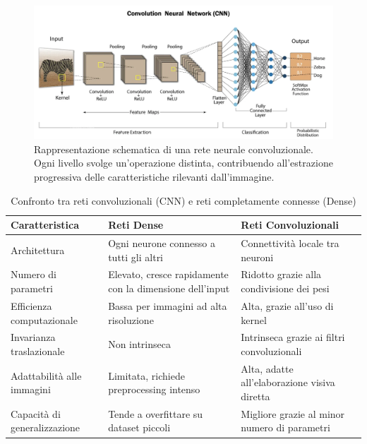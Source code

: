 \begin{figure}[ht]
    \centering
    \includegraphics[width=\textwidth]{figure/ConvNN.png}
    \caption{Rappresentazione schematica di una rete neurale convoluzionale. Ogni livello svolge un’operazione distinta, contribuendo all’estrazione progressiva delle caratteristiche rilevanti dall’immagine.}
    \label{fig:ConvNN}
\end{figure}


\begin{table}[ht]
    \centering
    \caption{Confronto tra reti convoluzionali (CNN) e reti completamente connesse (Dense)}
    \label{tab:cnn_vs_dense}
    \begin{adjustbox}{width=\textwidth}
    \begin{tabular}{p{4.5cm}|p{4.5cm}|p{4.5cm}}
        \hline
        \textbf{Caratteristica} & \textbf{Reti Dense} & \textbf{Reti Convoluzionali} \\
        \hline
        Architettura & Ogni neurone connesso a tutti gli altri & Connettività locale tra neuroni \\
        \hline
        Numero di parametri & Elevato, cresce rapidamente con la dimensione dell’input & Ridotto grazie alla condivisione dei pesi \\
        \hline
        Efficienza computazionale & Bassa per immagini ad alta risoluzione & Alta, grazie all’uso di kernel \\
        \hline
        Invarianza traslazionale & Non intrinseca & Intrinseca grazie ai filtri convoluzionali \\
        \hline
        Adattabilità alle immagini & Limitata, richiede preprocessing intenso & Alta, adatte all’elaborazione visiva diretta \\
        \hline
        Capacità di generalizzazione & Tende a overfittare su dataset piccoli & Migliore grazie al minor numero di parametri \\
        \hline
    \end{tabular}
    \end{adjustbox}
\end{table}
